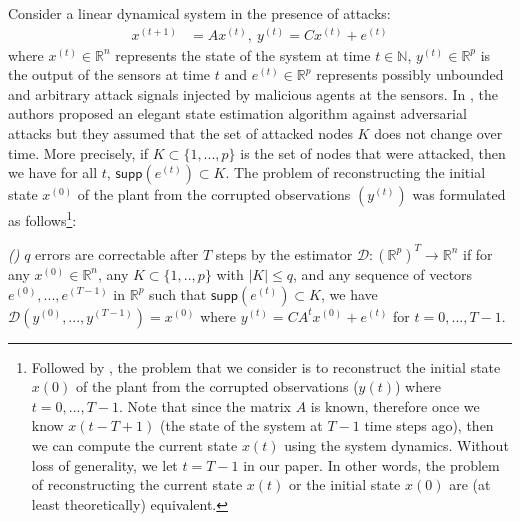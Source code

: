 \documentclass[../../thesis.tex]{subfiles}
\begin{document}
Consider a linear dynamical system in the presence of attacks:
\begin{eqnarray}
		x^{(t+1)} &= A x^{(t)}, ~y^{(t)} = C x ^{(t)} + e^{(t)}
		\label{eq:system_model}
\end{eqnarray}
where $x^{(t)}\in \mathbb{R}^n$ represents the state of the system at time $t\in \mathbb{N}$, $y^{(t)} \in \mathbb{R}^p$ is the output of the sensors at time $t$ and $e^{(t)} \in \mathbb{R}^p $ represents possibly unbounded and arbitrary attack signals injected by malicious agents at the sensors. In \cite{Fawzi:2014}, the authors proposed an elegant state estimation algorithm against adversarial attacks but they assumed that the set of attacked nodes $K$ does not change over time. More precisely, if $K \subset \{1, ..., p\}$ is the set of nodes that were attacked, then we have for all $t$, $\textsf{supp}(e^{(t)})\subset K$. The problem of reconstructing the initial state $x^{(0)}$ of the plant from the corrupted observations $( y^{(t)})$ was formulated as follows\footnote{Followed by \cite{Fawzi:2014}, the problem that we consider is to reconstruct the initial state $x(0)$ of the plant from the corrupted observations ($y(t)$) where $t=0,...,T-1$. Note that since the matrix $A$ is known, therefore once we know $x(t-T+1)$ (the state of the system at $T-1$ time steps ago), then we can compute the current state $x(t)$ using the system dynamics. Without loss of generality, we let $t=T-1$ in our paper. In other words, the problem of reconstructing the current state $x(t)$ or the initial state $x(0)$ are (at least theoretically) equivalent.}:

\begin{definition} \emph{(\hspace{1sp}\cite{Fawzi:2014})} 
$q$ errors are correctable after $T$ steps by the estimator $\mathcal{D}: {(\mathbb{R} ^p) } ^T  \rightarrow \mathbb{R}^n$ if for any $x^{(0)} \in \mathbb{R}^n$, any $K \subset \{1,.., p\} $ with $\lvert K \rvert \le q$, and any sequence of vectors $e^{(0)},...,e^{(T-1)}$ in $\mathbb{R}^p$ such that $\textsf{supp}(e^{(t)}) \subset K$, we have $\mathcal{D} (y^{(0)},...,y^{(T-1)}) = x^{(0)}$ where $y^{(t)} = CA^t x^{(0)} + e^{(t)}$ for $t=0,...,T-1$.
\end{definition}
\end{document}
